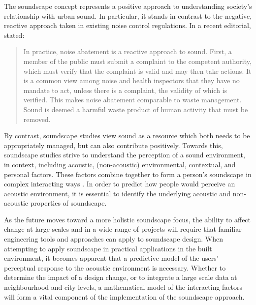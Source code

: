 The soundscape concept represents a positive approach to understanding society's relationship with urban sound. In particular, it stands in contrast to the negative, reactive approach taken in existing noise control regulations. In a recent editorial, \citet{Axelsson2020Soundscape} stated:

\begin{quote}
  In practice, noise abatement is a reactive approach to sound. First, a member of the public must submit a complaint to the competent authority, which must verify that the complaint is valid and may then take actions. It is a common view among noise and health inspectors that they have no mandate to act, unless there is a complaint, the validity of which is verified. This makes noise abatement comparable to waste management. Sound is deemed a harmful waste product of human activity that must be removed.
\end{quote}

By contrast, soundscape studies view sound as a resource which both needs to be appropriately managed, but can also contribute positively. Towards this, soundscape studies strive to understand the perception of a sound environment, in context, including acoustic, (non-acoustic) environmental, contextual, and personal factors. These factors combine together to form a person's soundscape in complex interacting ways \citep{Berglund2006Tool}. In order to predict how people would perceive an acoustic environment, it is essential to identify the underlying acoustic and non-acoustic properties of soundscape.

As the future moves toward a more holistic soundscape focus, the ability to affect change at large scales and in a wide range of projects will require that familiar engineering tools and approaches can apply to soundscape design. When attempting to apply soundscape in practical applications in the built environment, it becomes apparent that a predictive model of the users' perceptual response to the acoustic environment is necessary. Whether to determine the impact of a design change, or to integrate a large scale data at neighbourhood and city levels, a mathematical model of the interacting factors will form a vital component of the implementation of the soundscape approach. 



